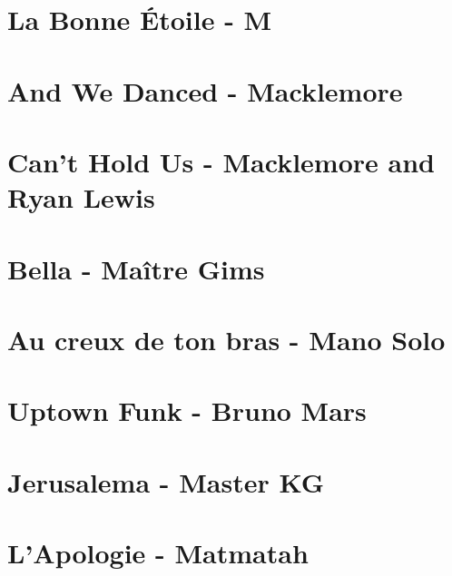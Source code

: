 \documentclass[11pt]{article}
\begin{document}
\section{La Bonne Étoile - M}
\begin{guitar}

\end{guitar}

\section{And We Danced - Macklemore}
\begin{guitar}

\end{guitar}

\section{Can't Hold Us - Macklemore and Ryan Lewis}
\begin{guitar}

\end{guitar}

\section{Bella - Maître Gims}
\begin{guitar}

\end{guitar}


\section{Au creux de ton bras - Mano Solo}
\begin{guitar}

\end{guitar}

\section{Uptown Funk - Bruno Mars}


\section{Jerusalema - Master KG}


\section{L'Apologie - Matmatah}

\end{document}

